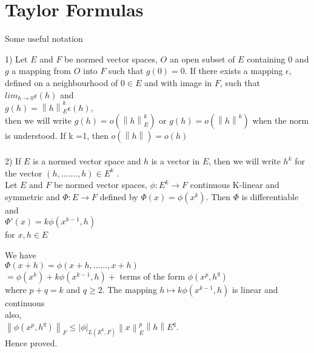 \documentclass[11 pt]{article}
\theoremstyle{definition}
\theoremstyle{remark}
\newcommand\norm[1]{\left\lVert#1\right\rVert}
\begin{document}
\newpage
\section{Taylor Formulas}
\normalfont
Some useful notation

1) Let $E$ and $F$ be normed vector spaces, $O$ an open subset of $E$ containing 0 and $g$
a mapping from $O$ into $F$ such that $g(0) = 0$. If there exists a mapping $\epsilon$, defined
on a neighbourhood of $0 \in E$ and with image in $F$, such that $lim_{h \to 0} \epsilon (h)$ and \\
\hspace*{3cm}			$g(h) = \norm{h}_E^k \epsilon(h)$,\\

then we will write $g(h) = o(\norm{h}_E^k)$ or $g(h) = o(\norm{h}^k)$ when the norm is understood. If k =1, then $o(\norm{h}) = o(h)$\\~\\

2) If $E$ is a normed vector space and $h$ is a vector in $E$, then we will write $h^k$ for
the vector $(h,.......,h) \in E^k$ .\\

\lemma Let $E$ and $F$ be normed vector spaces, $\phi : E^k \to F$ continuous K-linear and symmetric and $\Phi : E \to F $ defined by $ \Phi (x) = \phi (x^k)$. Then $\Phi$ is differentiable and \\
\hspace*{3cm} $\Phi '(x) = k \phi (x^{k-1} , h)$\\

for $x,h \in E$

\proof
\normalfont We have\\

\quad $\Phi(x + h) = \phi(x+h,......,x+h)$\\
\hspace*{2cm}		$= \phi(x^k) + k\phi (x^{k-1}, h) +$ terms of the form $\phi (x^p, h^q)$\\

where $p + q = k$ and $q \geq 2$. The mapping $h \mapsto k\phi (x^{k-1}, h)$ is linear and continuous\\
also,\\ \hspace*{2cm} $\norm{\phi (x^p, h^q)}_F \leq |\phi|_{L(E^k, F)} \norm{x}_E^p \norm{h}E^q$.\\

Hence proved.
\end{document}
